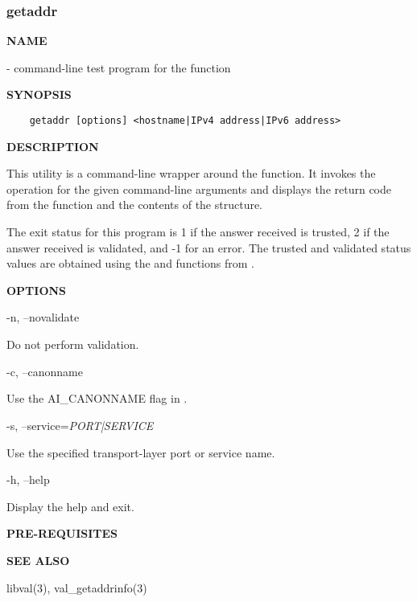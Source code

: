 \clearpage

\subsubsection{getaddr}

{\bf NAME}

 - command-line test program for the 
function 

{\bf SYNOPSIS}

\begin{verbatim}
    getaddr [options] <hostname|IPv4 address|IPv6 address>
\end{verbatim}

{\bf DESCRIPTION}

This utility is a command-line wrapper around the 
function.  It invokes the  operation for the given
command-line arguments and displays the return code from the function and the
contents of the  structure.

The exit status for this program is 1 if the answer received is trusted, 2 if
the answer received is validated, and -1 for an error.  The trusted and
validated status values are obtained using the  and
 functions from .

{\bf OPTIONS}

\begin{description}

\item -n, --novalidate\verb" "

Do not perform validation.

\item -c, --canonname\verb" "

Use the AI\_CANONNAME flag in .

\item -s, --service={\it PORT|SERVICE}\verb" "

Use the specified transport-layer port or service name.

\item -h, --help\verb" "

Display the help and exit.

\end{description}

{\bf PRE-REQUISITES}


{\bf SEE ALSO}

libval(3), val\_getaddrinfo(3)

